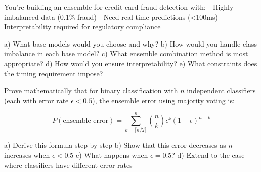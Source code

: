 \documentclass{article}
\newcounter{exercise}
\begin{document}
\begin{tcolorbox}[colback=gray!5!white,colframe=gray!75!black,title=Problem \stepcounter{exercise}: Real-world Ensemble Design]

You're building an ensemble for credit card fraud detection with:
- Highly imbalanced data (0.1\% fraud)
- Need real-time predictions (<100ms)
- Interpretability required for regulatory compliance

a) What base models would you choose and why?
b) How would you handle class imbalance in each base model?
c) What ensemble combination method is most appropriate?
d) How would you ensure interpretability?
e) What constraints does the timing requirement impose?
\end{tcolorbox}

\begin{tcolorbox}[colback=gray!5!white,colframe=gray!75!black,title=Problem \stepcounter{exercise}: Advanced Challenge]

Prove mathematically that for binary classification with $n$ independent classifiers (each with error rate $\epsilon < 0.5$), the ensemble error using majority voting is:

$$P(\text{ensemble error}) = \sum_{k=\lceil n/2 \rceil}^{n} \binom{n}{k} \epsilon^k (1-\epsilon)^{n-k}$$

a) Derive this formula step by step
b) Show that this error decreases as $n$ increases when $\epsilon < 0.5$
c) What happens when $\epsilon = 0.5$?
d) Extend to the case where classifiers have different error rates
\end{tcolorbox}
\end{document}
